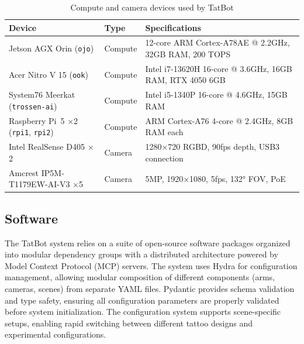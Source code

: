 \documentclass[11pt]{article}
\begin{document}
\begin{table}[h]
    \centering
    \caption{Compute and camera devices used by TatBot}
    \label{tab:hardware-devices}
    \begin{tabular}{lll}
        \toprule
        Device & Type & Specifications \\
        \midrule
        Jetson AGX Orin (\texttt{ojo}) & Compute & 12-core ARM Cortex-A78AE @ 2.2GHz, 32GB RAM, 200 TOPS \\
        Acer Nitro V 15 (\texttt{ook}) & Compute & Intel i7-13620H 16-core @ 3.6GHz, 16GB RAM, RTX 4050 6GB \\
        System76 Meerkat (\texttt{trossen-ai}) & Compute & Intel i5-1340P 16-core @ 4.6GHz, 15GB RAM \\
        Raspberry Pi~5 $\times$2 (\texttt{rpi1}, \texttt{rpi2}) & Compute & ARM Cortex-A76 4-core @ 2.4GHz, 8GB RAM each \\
        Intel RealSense D405 $\times$2 & Camera & 1280×720 RGBD, 90fps depth, USB3 connection \\
        Amcrest IP5M-T1179EW-AI-V3 $\times$5 & Camera & 5MP, 1920×1080, 5fps, 132° FOV, PoE \\
        \bottomrule
    \end{tabular}
\end{table}

\subsection{Software}

The TatBot system relies on a suite of open-source software packages organized into modular dependency groups with a distributed architecture powered by Model Context Protocol (MCP) servers.
The system uses Hydra for configuration management, allowing modular composition of different components (arms, cameras, scenes) from separate YAML files.
Pydantic provides schema validation and type safety, ensuring all configuration parameters are properly validated before system initialization.
The configuration system supports scene-specific setups, enabling rapid switching between different tattoo designs and experimental configurations.
\end{document}
